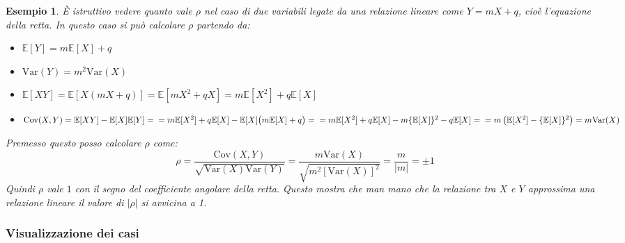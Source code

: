 \documentclass[openany,a4paper,12pt]{book}
\newtheorem*{example}{Esempio}
\theoremstyle{remark}
\begin{document}
\begin{example}
È istruttivo vedere quanto vale $\rho$ nel caso di due variabili legate da una relazione lineare come $Y = mX + q$, cioè l'equazione della retta. In questo caso si può calcolare $\rho$ partendo da:
\begin{itemize}
    \item $\mathbb{E}[Y] = m\mathbb{E}[X] + q$
    \item $\text{Var}(Y) = m^2 \text{Var}(X)$
    \item $\mathbb{E}[XY] = \mathbb{E}[X(mX + q)] = \mathbb{E}[mX^2 + qX] = m\mathbb{E}[X^2] + q\mathbb{E}[X]$
    \item $\text{Cov}(X,Y) = \mathbb{E}[XY] - \mathbb{E}[X]\mathbb{E}[Y] = \\
          = m\mathbb{E}[X^2] + q\mathbb{E}[X] - \mathbb{E}[X]\big(m\mathbb{E}[X] + q\big) = \\
          = m\mathbb{E}[X^2] + q\mathbb{E}[X] - m\{\mathbb{E}[X]\}^2 - q\mathbb{E}[X] = \\
          = m\left( \mathbb{E}[X^2] - \{\mathbb{E}[X]\}^2 \right) = m\text{Var}(X)$
\end{itemize}
Premesso questo posso calcolare $\rho$ come:
\begin{equation}
    \rho = \frac{\text{Cov}(X,Y)}{\sqrt{\text{Var}(X)\text{Var}(Y)}} = \frac{m \text{Var}(X)}{\sqrt{m^2 [\text{Var}(X)]^2}} = \frac{m}{|m|} = \pm 1
\end{equation}
Quindi $\rho$ vale $1$ con il \textit{segno} del coefficiente angolare della retta. Questo mostra che man mano che la relazione tra $X$ e $Y$ approssima una relazione lineare il valore di $|\rho|$ si avvicina a 1.

\end{example}


\subsubsection*{Visualizzazione dei casi}
\end{document}
